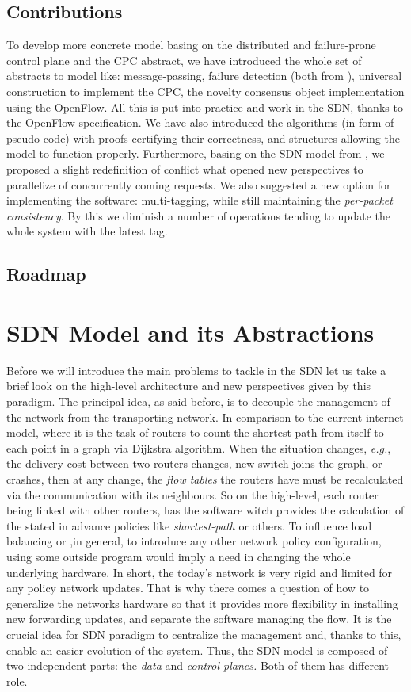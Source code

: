 \documentclass{article}
\theoremstyle{remark}
\begin{document}
\subsection{Contributions}
To develop more concrete model basing on the distributed and failure-prone control plane and the CPC abstract, we have introduced the whole set of abstracts to model like: message-passing, failure detection (both from \cite{Guerraoui:2010:IRD:1951643}), universal construction \cite{Herlihy:2008:AMP:1734069} to implement the CPC, the novelty consensus object implementation using the OpenFlow. All this is put into practice  and work in the SDN, thanks to the OpenFlow specification. We have also introduced the algorithms (in form of pseudo-code) with proofs certifying their correctness, and structures allowing the model to function properly. Furthermore, basing on the SDN model from \cite{CKLS15}, we proposed a slight redefinition of conflict what opened new perspectives to parallelize of concurrently coming requests. We also suggested a new option for implementing the software: multi-tagging, while still maintaining the \emph{per-packet consistency}. By this we diminish a number of operations tending to update the whole system with the latest tag.
\subsection{Roadmap}
\section{SDN Model and its Abstractions}
   Before we will introduce the main problems to tackle in the SDN let us take a brief look on the high-level architecture and new perspectives given by this paradigm.
The principal idea, as said before, is to decouple the management of the network from the transporting network. In comparison to the current internet model, where it is the task of routers to count the shortest path from itself to each point in a graph via Dijkstra algorithm. When the situation changes, \emph{e.g.}, the delivery cost between two routers changes, new switch joins the graph, or crashes, then at any change, the \emph{flow tables} the routers have must be recalculated via the communication with its neighbours. So on the high-level, each router being linked with other routers, has the software witch provides the calculation of the stated in advance policies like \emph{shortest-path} or others. To influence load balancing or ,in general, to introduce any other network policy configuration, using some outside program would imply a need in changing the whole underlying hardware. In short, the today's network is very rigid and limited for any policy network updates.
That is why there comes a question of how to generalize the 
networks hardware so that it provides more flexibility in 
installing new forwarding updates, and separate the software 
managing the flow. It is the crucial idea for SDN paradigm
 to centralize the management and, thanks to this, enable an
 easier evolution of the system. 
Thus, the SDN model is composed of two independent parts:
 the \emph{data} and \emph{control planes.} Both of them has
different role. 
\end{document}
